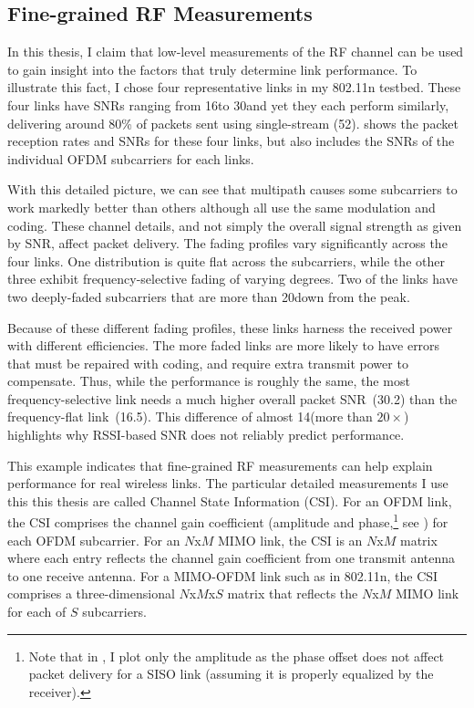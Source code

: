 \subsection{Fine-grained RF Measurements}
In this thesis, I claim that low-level measurements of the RF channel can be used to gain insight into the factors that truly determine link performance. To illustrate this fact, I chose four representative links in my 802.11n testbed. These four links have SNRs ranging from 16\dB to 30\dB and yet they each perform similarly, delivering around 80\% of packets sent using single-stream  (52\Mbps).  shows the packet reception rates and SNRs for these four links, but also includes the SNRs of the individual OFDM subcarriers for each links.

With this detailed picture, we can see that multipath causes some subcarriers to work markedly better than others although all use the same modulation and coding. These channel details, and not simply the overall signal strength as given by SNR, affect packet delivery. The fading profiles vary significantly across the four links. One distribution is quite flat across the subcarriers, while the other three exhibit frequency-selective fading of varying degrees. Two of the links have two deeply-faded subcarriers that are more than 20\dB down from the peak.

Because of these different fading profiles, these links harness the received power with different efficiencies.
The more faded links are more likely to have errors that must be repaired with coding, and require extra transmit power to compensate. Thus, while the performance is roughly the same, the most frequency-selective link needs a much higher overall packet SNR~(30.2\dB) than the frequency-flat link~(16.5\dB). This difference of almost 14\dB (more than $20\times$) highlights why RSSI-based SNR does not reliably predict performance.

This example indicates that fine-grained RF measurements can help explain performance for real wireless links. The particular detailed measurements I use this this thesis are called Channel State Information (CSI). For an OFDM link, the CSI comprises the channel gain coefficient (amplitude and phase,\footnote{Note that in , I plot only the amplitude as the phase offset does not affect packet delivery for a SISO link (assuming it is properly equalized by the receiver).} see ) for each OFDM subcarrier. For an $N$x$M$ MIMO link, the CSI is an $N$x$M$ matrix where each entry reflects the channel gain coefficient from one transmit antenna to one receive antenna. For a MIMO-OFDM link such as in 802.11n, the CSI comprises a three-dimensional $N$x$M$x$S$ matrix that reflects the $N$x$M$ MIMO link for each of $S$ subcarriers.

